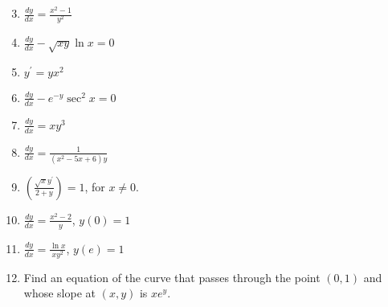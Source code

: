 \documentclass[12pt]{article}
\newif\ifans
\begin{document}
\medskip

\begin{enumerate}
\setcounter{enumi}{2}

\item $\frac{dy}{dx}=\frac{x^2-1}{y^2}$

\ifans{\fbox{$y=\sqrt[3]{x^3-3x+C}$}} \fi

\item $\frac{dy}{dx}-\sqrt{xy}\ln{x}=0$

\ifans{\fbox{$y=\left(\frac{1}{3}x^{3/2}\ln{x}-\frac{2}{9}x^{3/2}+C\right)^2$, $y=0$; Detailed Solution: \textcolor{blue}{\href{http://www.math.drexel.edu/classes/Calculus/resources/Math123HW/Solutions/123_01_Separable_04.pdf}{Here}}}} \fi

\item $y^{\prime}=yx^2$

\ifans{\fbox{$y=Ce^{x^3/3}$}} \fi

\item $\frac{dy}{dx}-e^{-y}\sec^2{x}=0$

\ifans{\fbox{$y=\ln{(\tan{x}+C)}$}} \fi

\item $\frac{dy}{dx}=xy^3$

\ifans{\fbox{$y=\pm\sqrt{\frac{1}{C-x^2}}$, $y=0$}} \fi

\item $\frac{dy}{dx}=\frac{1}{(x^2-5x+6)y}$

\ifans{\fbox{$y=\pm\sqrt{2\ln{\left|\frac{x-3}{x-2}\right|}+C}$}} \fi

\item $\left(\frac{\sqrt{x}y^\prime}{2+y}\right)=1$, for $x \neq 0$.  

\ifans{\fbox{$y=Ce^{2\sqrt{x}}-2$, $C \neq 0$}} \fi

\end{enumerate}

\medskip


\medskip

\begin{enumerate}
\setcounter{enumi}{9}

\item $\frac{dy}{dx}=\frac{x^2-2}{y}$, $y(0)=1$

\ifans{\fbox{$y=\sqrt{\frac{2x^3}{3}-4x+1}$}} \fi

\item $\frac{dy}{dx}=\frac{\ln{x}}{xy^2}$, $y(e)=1$

\ifans{\fbox{$y=\sqrt[3]{\frac{3(\ln{x})^2-1}{2}}$}} \fi

\item Find an equation of the curve that passes through the point $(0,1)$ and whose slope at $(x,y)$ is $xe^y$.

\ifans{\fbox{$y = -\ln{\left(\frac{1}{e}-\frac{x^2}{2}\right)}$; Detailed Solution: \textcolor{blue}{\href{http://www.math.drexel.edu/classes/Calculus/resources/Math123HW/Solutions/123_01_Separable_12.pdf}{Here}}}} \fi

\end{enumerate}
\end{document}
